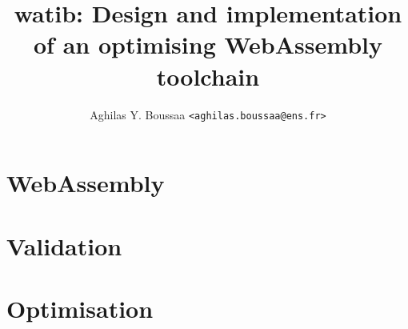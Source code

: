 \documentclass[11pt]{article}
\author{Aghilas Y. Boussaa \texttt{<aghilas.boussaa@ens.fr>}}
\title{\textsf{watib}: Design and implementation of an optimising WebAssembly toolchain}
\begin{document}
\maketitle
\begin{abstract}

\end{abstract}
\section{WebAssembly}
\section{Validation}
\section{Optimisation}
\end{document}
